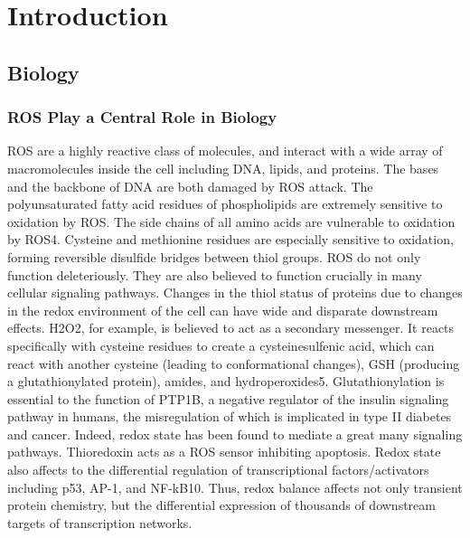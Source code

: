
\chapter{Introduction} %

\label{Chapter1} %


\section{Biology}

\subsection{ROS Play a Central Role in Biology}

ROS are a highly reactive class of molecules, and interact with a wide array of macromolecules inside the cell including DNA, lipids, and proteins. The bases and the backbone of DNA are both damaged by ROS attack. The polyunsaturated fatty acid residues of phospholipids are extremely sensitive to oxidation by ROS. The side chains of all amino acids are vulnerable to oxidation by ROS4. Cysteine and methionine residues are especially sensitive to oxidation, forming reversible disulfide bridges between thiol groups.
ROS do not only function deleteriously. They are also believed to function crucially in many cellular signaling pathways. Changes in the thiol status of proteins due to changes in the redox environment of the cell can have wide and disparate downstream effects. H2O2, for example, is believed to act as a secondary messenger. It reacts specifically with cysteine residues to create a cysteinesulfenic acid, which can react with another cysteine (leading to conformational changes), GSH (producing a glutathionylated protein), amides, and hydroperoxides5. Glutathionylation is essential to the function of PTP1B, a negative regulator of the insulin signaling pathway in humans, the misregulation of which is implicated in type II diabetes and cancer. Indeed, redox state has been found to mediate a great many signaling pathways. Thioredoxin acts as a ROS sensor inhibiting apoptosis. Redox state also affects to the differential regulation of transcriptional factors/activators including p53, AP-1, and NF-kB10. Thus, redox balance affects not only transient protein chemistry, but the differential expression of thousands of downstream targets of transcription networks.

